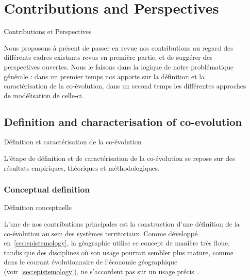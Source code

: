 




\newpage


\section{Contributions and Perspectives}{Contributions et Perspectives}

\label{sec:contributions}



Nous proposons à présent de passer en revue nos contributions au regard des différents cadres existants revus en première partie, et de suggérer des perspectives ouvertes. Nous le faisons dans la logique de notre problématique générale : dans un premier temps nos apports sur la définition et la caractérisation de la co-évolution, dans un second temps les différentes approches de modélisation de celle-ci.



\subsection{Definition and characterisation of co-evolution}{Définition et caractérisation de la co-évolution}


L'étape de définition et de caractérisation de la co-évolution se repose sur des résultats empiriques, théoriques et méthodologiques.


\subsubsection{Conceptual definition}{Définition conceptuelle}

L'une de nos contributions principales est la construction d'une définition de la co-évolution au sein des systèmes territoriaux. Comme développé en~\ref{sec:epistemology}, la géographie utilise ce concept de manière très floue, tandis que des disciplines où son usage pourrait sembler plus mature, comme dans le courant évolutionnaire de l'économie géographique (voir~\ref{sec:epistemology}), ne s'accordent pas sur un usage précis~\cite{schamp201020}.


